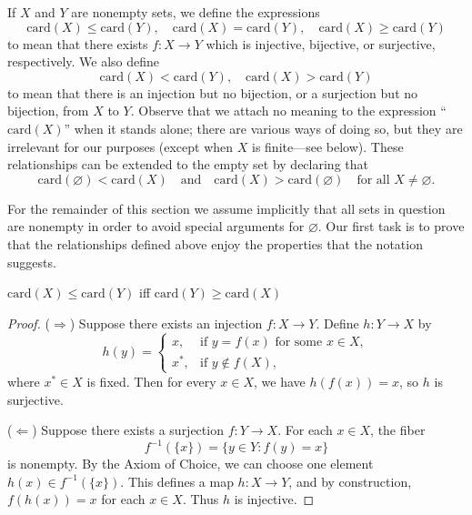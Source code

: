 \begin{definition}
    If $X$ and $Y$ are nonempty sets, we define the expressions
\[
\mathrm{card}(X) \leq \mathrm{card}(Y), \quad
\mathrm{card}(X) = \mathrm{card}(Y), \quad
\mathrm{card}(X) \geq \mathrm{card}(Y)
\]
to mean that there exists $f : X \to Y$ which is injective, bijective, or surjective,
respectively. We also define
\[
\mathrm{card}(X) < \mathrm{card}(Y), \quad
\mathrm{card}(X) > \mathrm{card}(Y)
\]
to mean that there is an injection but no bijection, or a surjection but no bijection,
from $X$ to $Y$. Observe that we attach no meaning to the expression
``$\mathrm{card}(X)$'' when it stands alone; there are various ways of doing so, but
they are irrelevant for our purposes (except when $X$ is finite---see below). These
relationships can be extended to the empty set by declaring that
\[
\mathrm{card}(\varnothing) < \mathrm{card}(X)
\quad\text{and}\quad
\mathrm{card}(X) > \mathrm{card}(\varnothing)
\quad\text{for all } X \neq \varnothing.
\]

For the remainder of this section we assume implicitly that all sets in question are
nonempty in order to avoid special arguments for $\varnothing$. Our first task is to prove
that the relationships defined above enjoy the properties that the notation suggests.
\end{definition}

\begin{prop}
$\mathrm{card}(X) \le \mathrm{card}(Y)$ iff $\mathrm{card}(Y) \ge \mathrm{card}(X)$
\end{prop}

\begin{proof}
($\Rightarrow$) Suppose there exists an injection $f:X \to Y$. 
Define $h:Y \to X$ by
\[
   h(y) = 
   \begin{cases}
      x, & \text{if } y = f(x) \text{ for some } x \in X, \\
      x^*, & \text{if } y \notin f(X),
   \end{cases}
\]
where $x^*\in X$ is fixed. Then for every $x\in X$, we have $h(f(x))=x$, so $h$ is surjective.


($\Leftarrow$) Suppose there exists a surjection $f:Y \to X$. 
For each $x\in X$, the fiber 
\[
   f^{-1}(\{x\}) = \{ y \in Y : f(y)=x\}
\]
is nonempty. By the Axiom of Choice, we can choose one element $h(x)\in f^{-1}(\{x\})$. 
This defines a map $h:X \to Y$, and by construction, $f(h(x))=x$ for each $x\in X$. 
Thus $h$ is injective.
\end{proof}

